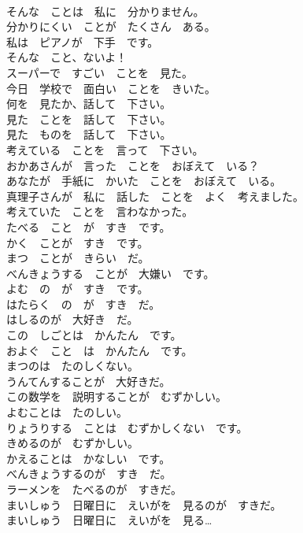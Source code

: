 \documentclass[8pt]{extreport}
\begin{document}
\begin{CJK}{UTF8}{min}
\\	そんな　ことは　私に　分かりません。	
\\	分かりにくい　ことが　たくさん　ある。	
\\	私は　ピアノが　下手　です。	
\\	そんな　こと、ないよ！	
\\	スーパーで　すごい　ことを　見た。	
\\	今日　学校で　面白い　ことを　きいた。	
\\	何を　見たか、話して　下さい。	
\\	見た　ことを　話して　下さい。	
\\	見た　ものを　話して　下さい。	
\\	考えている　ことを　言って　下さい。	
\\	おかあさんが　言った　ことを　おぼえて　いる？	
\\	あなたが　手紙に　かいた　ことを　おぼえて　いる。	
\\	真理子さんが　私に　話した　ことを　よく　考えました。	
\\	考えていた　ことを　言わなかった。	
\\	たべる　こと　が　すき　です。	
\\	かく　ことが　すき　です。	
\\	まつ　ことが　きらい　だ。	
\\	べんきょうする　ことが　大嫌い　です。	
\\	よむ　の　が　すき　です。	
\\	はたらく　の　が　すき　だ。	
\\	はしるのが　大好き　だ。	
\\	この　しごとは　かんたん　です。	
\\	およぐ　こと　は　かんたん　です。	
\\	まつのは　たのしくない。	
\\	うんてんすることが　大好きだ。	
\\	この数学を　説明することが　むずかしい。	
\\	よむことは　たのしい。	
\\	りょうりする　ことは　むずかしくない　です。	
\\	きめるのが　むずかしい。	
\\	かえることは　かなしい　です。	
\\	べんきょうするのが　すき　だ。	
\\	ラーメンを　たべるのが　すきだ。	
\\	まいしゅう　日曜日に　えいがを　見るのが　すきだ。	
\\	まいしゅう　日曜日に　えいがを　見る…	

\end{CJK}
\end{document}

